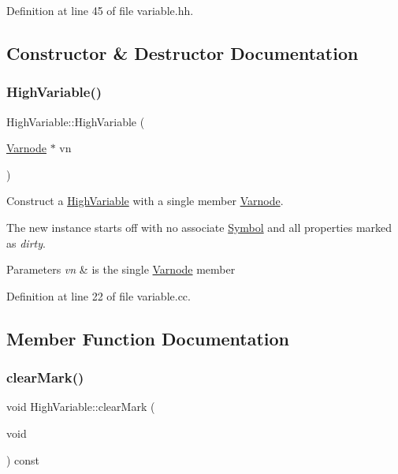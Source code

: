 Definition at line 45 of file variable.\+hh.



\subsection{Constructor \& Destructor Documentation}
\mbox{\label{class_high_variable_a227ed3f34ba507b5440e9bfc439c257c}} 
\subsubsection{\texorpdfstring{HighVariable()}{HighVariable()}}
{\footnotesize\ttfamily High\+Variable\+::\+High\+Variable (\begin{DoxyParamCaption}\item[{\mbox{\hyperlink{class_varnode}{Varnode}} $\ast$}]{vn }\end{DoxyParamCaption})}



Construct a \mbox{\hyperlink{class_high_variable}{High\+Variable}} with a single member \mbox{\hyperlink{class_varnode}{Varnode}}. 

The new instance starts off with no associate \mbox{\hyperlink{class_symbol}{Symbol}} and all properties marked as {\itshape dirty}. 
\begin{DoxyParams}{Parameters}
{\em vn} & is the single \mbox{\hyperlink{class_varnode}{Varnode}} member \\
\hline
\end{DoxyParams}


Definition at line 22 of file variable.\+cc.



\subsection{Member Function Documentation}
\mbox{\label{class_high_variable_ad2a2358b61d172dbaf311b0416e91fb3}} 
\subsubsection{\texorpdfstring{clearMark()}{clearMark()}}
{\footnotesize\ttfamily void High\+Variable\+::clear\+Mark (\begin{DoxyParamCaption}\item[{void}]{ }\end{DoxyParamCaption}) const\hspace{0.3cm}{\ttfamily [inline]}}



